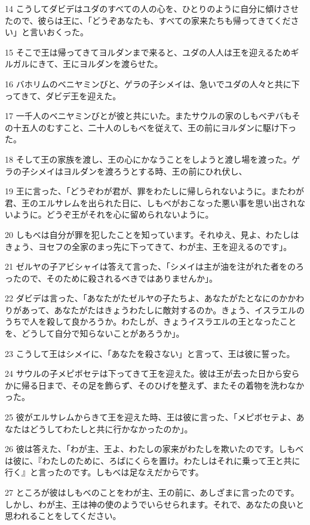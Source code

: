\par 14 こうしてダビデはユダのすべての人の心を、ひとりのように自分に傾けさせたので、彼らは王に、「どうぞあなたも、すべての家来たちも帰ってきてください」と言いおくった。
\par 15 そこで王は帰ってきてヨルダンまで来ると、ユダの人人は王を迎えるためギルガルにきて、王にヨルダンを渡らせた。
\par 16 バホリムのベニヤミンびと、ゲラの子シメイは、急いでユダの人々と共に下ってきて、ダビデ王を迎えた。
\par 17 一千人のベニヤミンびとが彼と共にいた。またサウルの家のしもべヂバもその十五人のむすこと、二十人のしもべを従えて、王の前にヨルダンに駆け下った。
\par 18 そして王の家族を渡し、王の心にかなうことをしようと渡し場を渡った。ゲラの子シメイはヨルダンを渡ろうとする時、王の前にひれ伏し、
\par 19 王に言った、「どうぞわが君が、罪をわたしに帰しられないように。またわが君、王のエルサレムを出られた日に、しもべがおこなった悪い事を思い出されないように。どうぞ王がそれを心に留められないように。
\par 20 しもべは自分が罪を犯したことを知っています。それゆえ、見よ、わたしはきょう、ヨセフの全家のまっ先に下ってきて、わが主、王を迎えるのです」。
\par 21 ゼルヤの子アビシャイは答えて言った、「シメイは主が油を注がれた者をのろったので、そのために殺されるべきではありませんか」。
\par 22 ダビデは言った、「あなたがたゼルヤの子たちよ、あなたがたとなにのかかわりがあって、あなたがたはきょうわたしに敵対するのか。きょう、イスラエルのうちで人を殺して良かろうか。わたしが、きょうイスラエルの王となったことを、どうして自分で知らないことがあろうか」。
\par 23 こうして王はシメイに、「あなたを殺さない」と言って、王は彼に誓った。
\par 24 サウルの子メピボセテは下ってきて王を迎えた。彼は王が去った日から安らかに帰る日まで、その足を飾らず、そのひげを整えず、またその着物を洗わなかった。
\par 25 彼がエルサレムからきて王を迎えた時、王は彼に言った、「メピボセテよ、あなたはどうしてわたしと共に行かなかったのか」。
\par 26 彼は答えた、「わが主、王よ、わたしの家来がわたしを欺いたのです。しもべは彼に、『わたしのために、ろばにくらを置け。わたしはそれに乗って王と共に行く』と言ったのです。しもべは足なえだからです。
\par 27 ところが彼はしもべのことをわが主、王の前に、あしざまに言ったのです。しかし、わが主、王は神の使のようでいらせられます。それで、あなたの良いと思われることをしてください。
